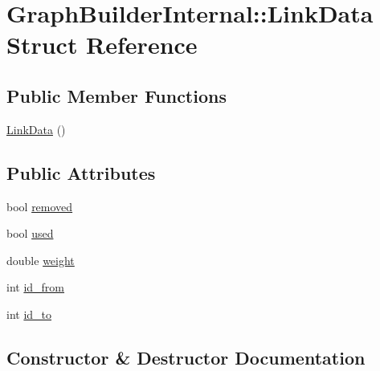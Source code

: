 \hypertarget{struct_graph_builder_internal_1_1_link_data}{}\section{Graph\+Builder\+Internal\+::Link\+Data Struct Reference}
\label{struct_graph_builder_internal_1_1_link_data}
\subsection*{Public Member Functions}
\begin{DoxyCompactItemize}
\item 
\mbox{\hyperlink{struct_graph_builder_internal_1_1_link_data_aa82c507c9397b333f85154394783bf2e}{Link\+Data}} ()
\end{DoxyCompactItemize}
\subsection*{Public Attributes}
\begin{DoxyCompactItemize}
\item 
bool \mbox{\hyperlink{struct_graph_builder_internal_1_1_link_data_ae2cf83a94c5a3584b66eb9d05633b17d}{removed}}
\item 
bool \mbox{\hyperlink{struct_graph_builder_internal_1_1_link_data_a17211fb7e5a494c3cc5aad7a60cae555}{used}}
\item 
double \mbox{\hyperlink{struct_graph_builder_internal_1_1_link_data_aa7c3798b907f445e88765553a4aa8223}{weight}}
\item 
int \mbox{\hyperlink{struct_graph_builder_internal_1_1_link_data_acb349318307b10f7f891e4fd76a6b21f}{id\+\_\+from}}
\item 
int \mbox{\hyperlink{struct_graph_builder_internal_1_1_link_data_aa96e23567142784f4dac62771d13c296}{id\+\_\+to}}
\end{DoxyCompactItemize}


\subsection{Constructor \& Destructor Documentation}
\mbox{\label{struct_graph_builder_internal_1_1_link_data_aa82c507c9397b333f85154394783bf2e}} 
